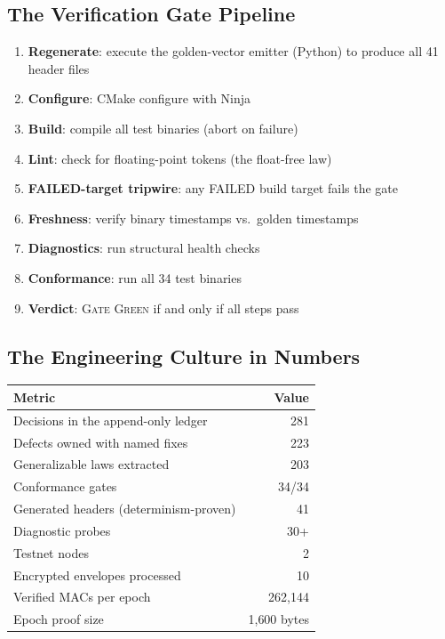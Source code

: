 \documentclass[11pt, a4paper]{article}
\theoremstyle{plain}
\theoremstyle{definition}
\theoremstyle{remark}
\newcommand{\GATE}{\textsc{Gate Green}}
\begin{document}
\subsection{The Verification Gate Pipeline}

\begin{enumerate}
\item \textbf{Regenerate}: execute the golden-vector emitter (Python)
to produce all 41 header files
\item \textbf{Configure}: CMake configure with Ninja
\item \textbf{Build}: compile all test binaries (abort on failure)
\item \textbf{Lint}: check for floating-point tokens (the float-free law)
\item \textbf{FAILED-target tripwire}: any FAILED build target fails
the gate
\item \textbf{Freshness}: verify binary timestamps vs.\ golden timestamps
\item \textbf{Diagnostics}: run structural health checks
\item \textbf{Conformance}: run all 34 test binaries
\item \textbf{Verdict}: \GATE{} if and only if all steps pass
\end{enumerate}

\subsection{The Engineering Culture in Numbers}

\begin{table}[h]
\centering
{}
\begin{tabular}{lr}
\rowcolor{hsmaGold!20} \textbf{Metric} & \textbf{Value} \\
\midrule
Decisions in the append-only ledger & 281 \\
Defects owned with named fixes & 223 \\
Generalizable laws extracted & 203 \\
Conformance gates & 34/34 \\
Generated headers (determinism-proven) & 41 \\
Diagnostic probes & 30+ \\
Testnet nodes & 2 \\
Encrypted envelopes processed & 10 \\
Verified MACs per epoch & 262{,}144 \\
Epoch proof size & 1{,}600 bytes \\
\bottomrule
\end{tabular}
\end{table}
\end{document}
